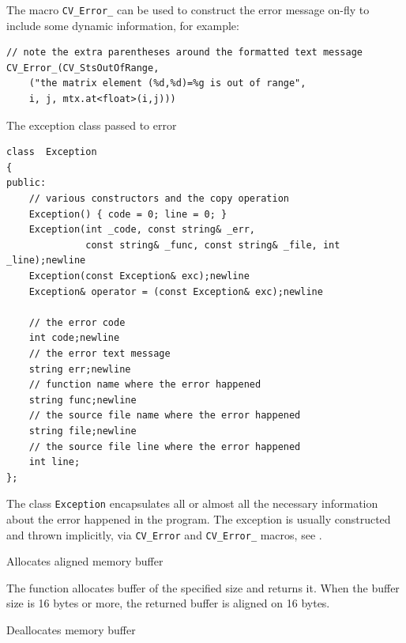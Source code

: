 The macro \texttt{CV\_Error\_} can be used to construct the error message on-fly to include some dynamic information, for example:

\begin{lstlisting}
// note the extra parentheses around the formatted text message
CV_Error_(CV_StsOutOfRange,
    ("the matrix element (%d,%d)=%g is out of range",
    i, j, mtx.at<float>(i,j)))
\end{lstlisting}


The exception class passed to error

\begin{lstlisting}
class  Exception
{
public:
    // various constructors and the copy operation
    Exception() { code = 0; line = 0; }
    Exception(int _code, const string& _err,
              const string& _func, const string& _file, int _line);newline
    Exception(const Exception& exc);newline
    Exception& operator = (const Exception& exc);newline

    // the error code
    int code;newline
    // the error text message
    string err;newline
    // function name where the error happened
    string func;newline
    // the source file name where the error happened
    string file;newline
    // the source file line where the error happened
    int line;
};
\end{lstlisting}

The class \texttt{Exception} encapsulates all or almost all the necessary information about the error happened in the program. The exception is usually constructed and thrown implicitly, via \texttt{CV\_Error} and \texttt{CV\_Error\_} macros, see .


Allocates aligned memory buffer

\begin{description}
\end{description}
 
The function allocates buffer of the specified size and returns it. When the buffer size is 16 bytes or more, the returned buffer is aligned on 16 bytes.

Deallocates memory buffer

\begin{description}
\end{description}

